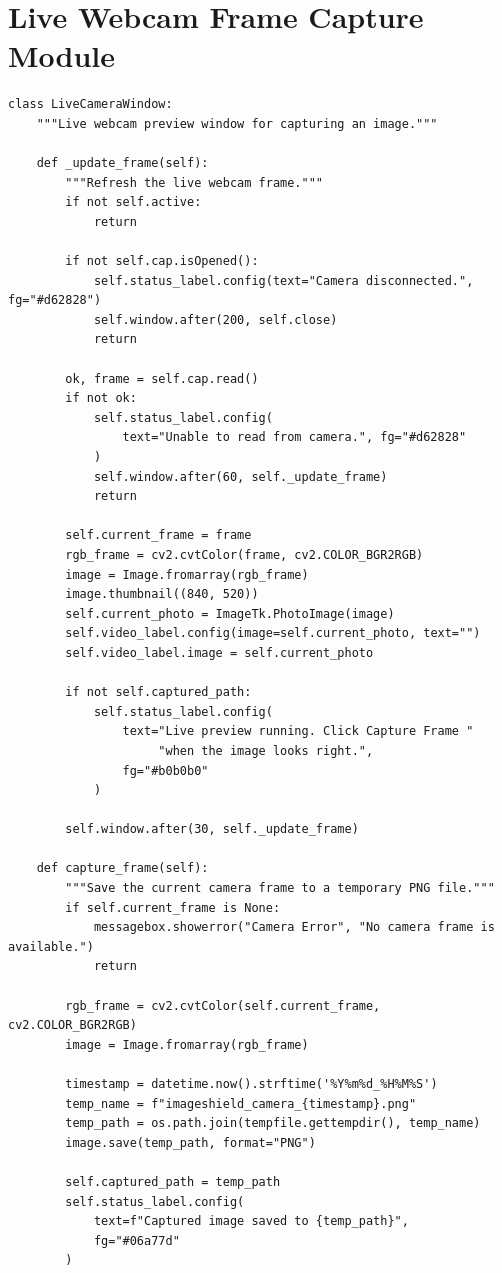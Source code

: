 \documentclass[12pt,a4paper]{report}
\begin{document}
\section{Live Webcam Frame Capture Module}
\begin{lstlisting}
class LiveCameraWindow:
    """Live webcam preview window for capturing an image."""

    def _update_frame(self):
        """Refresh the live webcam frame."""
        if not self.active:
            return

        if not self.cap.isOpened():
            self.status_label.config(text="Camera disconnected.", fg="#d62828")
            self.window.after(200, self.close)
            return

        ok, frame = self.cap.read()
        if not ok:
            self.status_label.config(
                text="Unable to read from camera.", fg="#d62828"
            )
            self.window.after(60, self._update_frame)
            return

        self.current_frame = frame
        rgb_frame = cv2.cvtColor(frame, cv2.COLOR_BGR2RGB)
        image = Image.fromarray(rgb_frame)
        image.thumbnail((840, 520))
        self.current_photo = ImageTk.PhotoImage(image)
        self.video_label.config(image=self.current_photo, text="")
        self.video_label.image = self.current_photo

        if not self.captured_path:
            self.status_label.config(
                text="Live preview running. Click Capture Frame "
                     "when the image looks right.",
                fg="#b0b0b0"
            )

        self.window.after(30, self._update_frame)

    def capture_frame(self):
        """Save the current camera frame to a temporary PNG file."""
        if self.current_frame is None:
            messagebox.showerror("Camera Error", "No camera frame is available.")
            return

        rgb_frame = cv2.cvtColor(self.current_frame, cv2.COLOR_BGR2RGB)
        image = Image.fromarray(rgb_frame)

        timestamp = datetime.now().strftime('%Y%m%d_%H%M%S')
        temp_name = f"imageshield_camera_{timestamp}.png"
        temp_path = os.path.join(tempfile.gettempdir(), temp_name)
        image.save(temp_path, format="PNG")

        self.captured_path = temp_path
        self.status_label.config(
            text=f"Captured image saved to {temp_path}",
            fg="#06a77d"
        )
\end{lstlisting}
\end{document}
